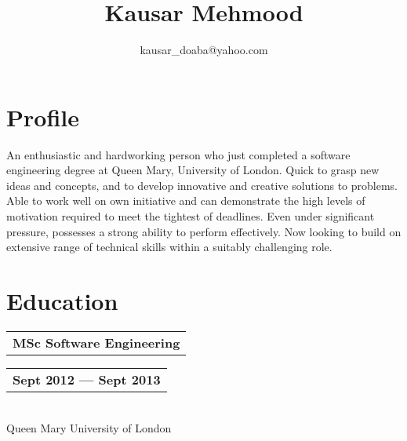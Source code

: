 \documentclass[a4paper]{article}
\title{Kausar Mehmood}
\author{kausar\_doaba@yahoo.com}
\date{}
\begin{document}
            
            \maketitle
            
            \section*{Profile}
                An enthusiastic and hardworking person who just completed a software engineering degree at Queen Mary, University of London. Quick to grasp new ideas and concepts, and to develop innovative and creative solutions to problems. Able to work well on own initiative and can demonstrate the high levels of motivation required to meet the tightest of deadlines. Even under significant pressure, possesses a strong ability to perform effectively. Now looking to build on extensive range of technical skills within a suitably challenging role.
            
            
            
            \section*{Education}
                
                \begin{tabular}[t]{@{}l} 
                    \textbf{MSc Software Engineering}
                \end{tabular}
                \hfill
                \begin{tabular}[t]{l@{}}
                    \textbf{Sept 2012 --- Sept 2013}
                \end{tabular}\\
                Queen Mary University of London
        
\end{document}
